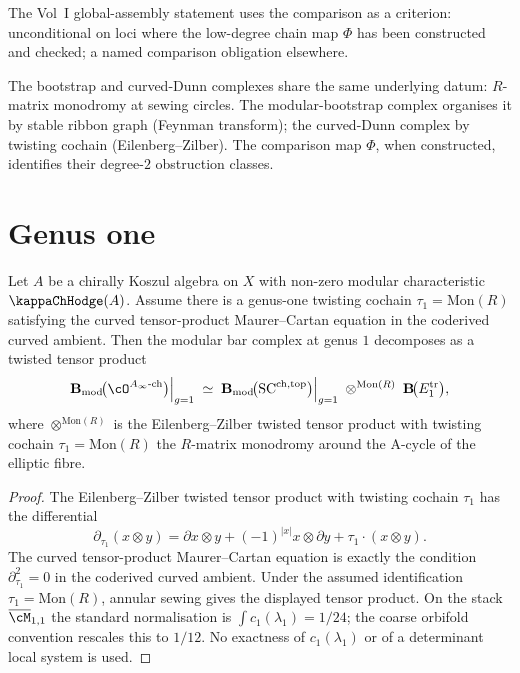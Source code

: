 \begin{remark}
\label{rem:bridge-vol1-consumer}
The Vol~I global-assembly statement uses the comparison as a
criterion: unconditional on loci where the low-degree chain map
\(\Phi\) has been constructed and checked; a named comparison
obligation elsewhere.
\end{remark}

\begin{remark}
\label{rem:bridge-provenance}
The bootstrap and curved-Dunn complexes share the same underlying
datum: \(R\)-matrix monodromy at sewing circles. The
modular-bootstrap complex organises it by stable ribbon graph
(Feynman transform); the curved-Dunn complex by twisting cochain
(Eilenberg--Zilber). The comparison map \(\Phi\), when
constructed, identifies their degree-\(2\) obstruction classes.
\end{remark}

\section{Genus one}
\label{sec:genus-one-gauss-manin}

\begin{proposition}
\label{prop:genus1-twisted-tensor-product}
Let \(A\) be a chirally Koszul algebra on \(X\) with non-zero
modular characteristic \(\kappaChHodge(A)\). Assume there is a genus-one
twisting cochain \(\tau_{1}=\mathrm{Mon}(R)\) satisfying the curved
tensor-product Maurer--Cartan equation in the coderived curved
ambient. Then the modular bar complex at genus \(1\) decomposes as a
twisted tensor product
\[
 \mathbf{B}_{\mathrm{mod}}\!\bigl(\cO^{A_{\infty}\text{-ch}}\bigr)\Big|_{g=1}
 \;\simeq\;
 \mathbf{B}_{\mathrm{mod}}\!\bigl(\mathrm{SC}^{\mathrm{ch,top}}\bigr)\Big|_{g=1}
 \;\otimes^{\mathrm{Mon}(R)}\;
 \mathbf{B}\!\bigl(E_{1}^{\mathrm{tr}}\bigr),
\]
where \(\otimes^{\mathrm{Mon}(R)}\) is the Eilenberg--Zilber
twisted tensor product with twisting cochain
\(\tau_{1} = \mathrm{Mon}(R)\) the \(R\)-matrix monodromy around
the A-cycle of the elliptic fibre.
\end{proposition}

\begin{proof}
The Eilenberg--Zilber twisted tensor product with twisting cochain
\(\tau_{1}\) has the differential
\[
\partial_{\tau_{1}}(x\otimes y)=
\partial x\otimes y+(-1)^{|x|}x\otimes\partial y+
\tau_{1}\cdot(x\otimes y).
\]
The curved tensor-product Maurer--Cartan equation is exactly the
condition \(\partial_{\tau_{1}}^{2}=0\) in the coderived curved
ambient. Under the assumed identification
\(\tau_{1}=\mathrm{Mon}(R)\), annular sewing gives the displayed
tensor product. On the stack \(\overline{\cM}_{1,1}\) the standard
normalisation is \(\int c_{1}(\lambda_{1})=1/24\); the coarse
orbifold convention rescales this to \(1/12\). No exactness of
\(c_{1}(\lambda_{1})\) or of a determinant local system is used.
\end{proof}

